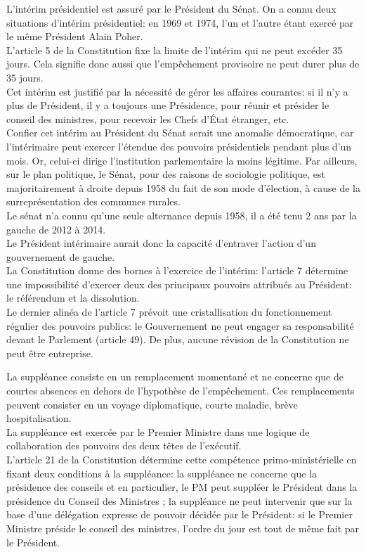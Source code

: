\documentclass[12pt, a4paper, openany]{book}
\begin{document}
L'intérim présidentiel est assuré par le Président du Sénat. On a connu deux situations d'intérim présidentiel: en 1969 et 1974, l'un et l'autre étant exercé par le même Président Alain Poher. \\
L'article 5 de la Constitution fixe la limite de l'intérim qui ne peut excéder 35 jours. Cela signifie donc aussi que l'empêchement provisoire ne peut durer plus de 35 jours. \\
Cet intérim est justifié par la nécessité de gérer les affaires courantes: si il n'y a plus de Président, il y a toujours une Présidence, pour réunir et présider le conseil des ministres, pour recevoir les Chefs d'État étranger, etc. \\
Confier cet intérim au Président du Sénat serait une anomalie démocratique, car l'intérimaire peut exercer l'étendue des pouvoirs présidentiels pendant plus d'un mois. Or, celui-ci dirige l'institution parlementaire la moins légitime. Par ailleurs, sur le plan politique, le Sénat, pour des raisons de sociologie politique, est majoritairement à droite depuis 1958 du fait de son mode d'élection, à cause de la surreprésentation des communes rurales. \\
Le sénat n'a connu qu'une seule alternance depuis 1958, il a été tenu 2 ans par la gauche de 2012 à 2014. \\
Le Président intérimaire aurait donc la capacité d'entraver l'action d'un gouvernement de gauche. \\
La Constitution donne des bornes à l'exercice de l'intérim: l'article 7 détermine une impossibilité d'exercer deux des principaux pouvoirs attribués au Président: le référendum et la dissolution. \\
Le dernier alinéa de l'article 7 prévoit une cristallisation du fonctionnement régulier des pouvoirs publics: le Gouvernement ne peut engager sa responsabilité devant le Parlement (article 49). De plus, aucune révision de la Constitution ne peut être entreprise. 


La suppléance consiste en un remplacement momentané et ne concerne que de courtes absences en dehors de l'hypothèse de l'empêchement. Ces remplacements peuvent consister en un voyage diplomatique, courte maladie, brève hospitalisation. \\
La suppléance est exercée par le Premier Ministre dans une logique de collaboration des pouvoirs des deux têtes de l'exécutif. \\
L'article 21 de la Constitution détermine cette compétence primo-ministérielle en fixant deux conditions à la suppléance: la suppléance ne concerne que la présidence des conseils et en particulier, le PM peut suppléer le Président dans la présidence du Conseil des Ministres ; la suppléance ne peut intervenir que sur la base d'une délégation expresse de pouvoir décidée par le Président: si le Premier Ministre préside le conseil des ministres, l'ordre du jour est tout de même fait par le Président. 
\end{document}

